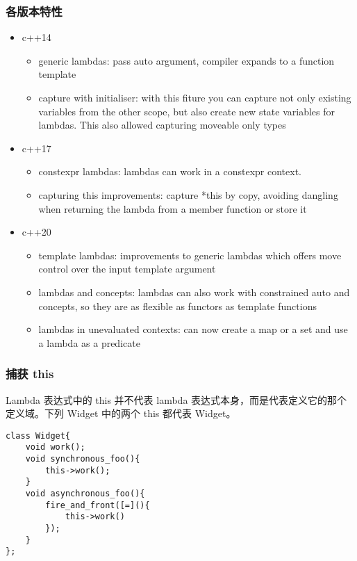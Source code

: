 \documentclass{article}
\begin{document}
\subsubsection{各版本特性}
\begin{itemize}
    \item c++14 
    \begin{itemize}
        \item generic lambdas: pass auto argument, 
            compiler expands to a function template
        \item capture with initialiser: with this fiture you can 
            capture not only existing variables from the other scope,
            but also create new state variables for lambdas. This 
            also allowed capturing moveable only types 
    \end{itemize}
    \item c++17
    \begin{itemize}
        \item constexpr lambdas: lambdas can work in a constexpr context.
        \item capturing this improvements: capture *this by copy, avoiding
            dangling when returning the lambda from a member function or 
            store it
    \end{itemize}
    \item c++20
    \begin{itemize}
        \item template lambdas: improvements to generic lambdas which offers
            move control over the input template argument
        \item lambdas and concepts: lambdas can also work with constrained 
            auto and concepts, so they are as flexible as functors as template functions 
        \item lambdas in unevaluated contexts: can now create a map or a set 
            and use a lambda as a predicate
    \end{itemize}
\end{itemize}


\subsubsection{捕获 this}
Lambda 表达式中的 this 并不代表 lambda 表达式本身，而是代表定义它的那个
定义域。下列 Widget 中的两个 this 都代表 Widget。
\begin{verbatim}
class Widget{
    void work();
    void synchronous_foo(){
        this->work();
    }
    void asynchronous_foo(){
        fire_and_front([=](){
            this->work()
        });
    }
};
\end{verbatim} 
\end{document}
